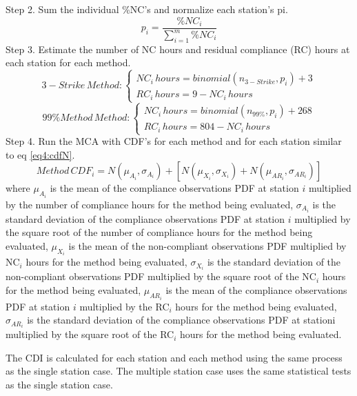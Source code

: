 Step 2. Sum the individual \%NC’s and normalize each station’s pi. 
%
\begin{equation}
\label{eq12:step2}
p_{i}=\frac{\%NC_{i}}{\sum_{i=1}^{m}\%NC_{i}}
\end{equation}
%
Step 3. Estimate the number of NC hours and residual compliance (RC) hours at each station for each method.
%
\begin{equation}
\label{eq13:step3a}
3-Strike \, Method:\left\{\begin{matrix}
NC_{i} \,hours=binomial(n_{3-Strike}, p_{i})+3\\ 
RC_{i} \,hours=9-NC_{i} \,hours
\end{matrix}\right.
\end{equation}
%
%
\begin{equation}
\label{eq14:step3b}
99\% Method \, Method:\left\{\begin{matrix}
NC_{i} \,hours=binomial(n_{99\%}, p_{i})+268\\ 
RC_{i} \,hours=804-NC_{i} \,hours
\end{matrix}\right.
\end{equation}
%
Step 4. Run the MCA with CDF’s for each method and for each station similar to eq \ref{eq4:cdfN}.
%
\begin{equation}
\label{eq15:cfdstep}
Method\, CDF_{i} = N(\mu_{A_{i}},\sigma_{A_{i}}) + [N(\mu_{X_{i}},\sigma_{X_{i}}) + N(\mu_{AR_{i}},\sigma_{AR_{i}})]
\end{equation}
%
\noindent
where $\mu_{A_{i}}$ is the mean of the compliance observations PDF at station $i$ multiplied by the number of compliance hours for the method being evaluated, $\sigma_{A_{i}}$ is the standard deviation of the compliance observations PDF at station $i$ multiplied by the square root of the number of compliance hours for the method being evaluated, $\mu_{X_{i}}$ is the mean of the non-compliant observations PDF multiplied by NC$_{i}$ hours for the method being evaluated, $\sigma_{X_{i}}$ is the standard deviation of the non-compliant observations PDF multiplied by the square root of the NC$_{i}$ hours for the method being evaluated, $\mu_{AR_{i}}$ is the mean of the compliance observations PDF at station $i$ multiplied by the RC$_{i}$ hours for the method being evaluated, $\sigma_{AR_{i}}$ is the standard deviation of the compliance observations PDF at stationi multiplied by the square root of the RC$_{i}$ hours for the method being evaluated.

The CDI is calculated for each station and each method using the same process as the single station case.  The multiple station case uses the same statistical tests as the single station case.
\clearpage

